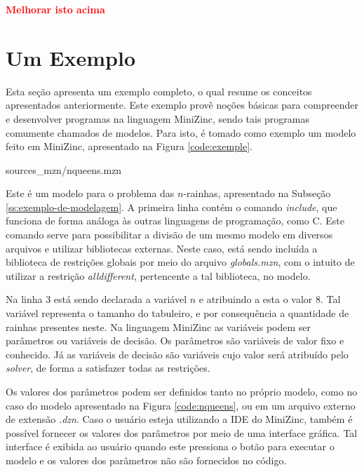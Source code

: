 {\bf \textcolor{red}{Melhorar isto acima}}



\section{Um Exemplo}

Esta seção apresenta um exemplo completo, o qual  resume os conceitos apresentados anteriormente.
Este exemplo provê noções básicas para compreender e desenvolver programas na linguagem MiniZinc, sendo tais programas comumente chamados de modelos. Para isto, é tomado como exemplo um modelo feito em MiniZinc, apresentado na Figura \ref{code:exemple}.


    {sources_mzn/nqueens.mzn}


Este é um modelo para o problema das $n$-rainhas, apresentado na Subseção \ref{ss:exemplo-de-modelagem}. A primeira linha contém o comando \textit{include}, que funciona de forma análoga às outras linguagens de programação, como C. Este comando serve para possibilitar a divisão de um mesmo modelo em diversos arquivos e utilizar bibliotecas externas. Neste caso, está sendo incluída a biblioteca de restrições globais por meio do arquivo \textit{globals.mzn}, com o intuito de utilizar a restrição \textit{alldifferent}, pertencente a tal biblioteca, no modelo.

Na linha 3 está sendo declarada a variável $n$ e atribuindo a esta o valor $8$. Tal variável representa o tamanho do tabuleiro, e por consequência a quantidade de rainhas presentes neste. Na linguagem MiniZinc as variáveis podem ser parâmetros ou variáveis de decisão. Os parâmetros são variáveis de valor fixo e conhecido. Já as variáveis de decisão são variáveis cujo valor será atribuído pelo \textit{solver}, de forma a satisfazer todas as restrições.

Os valores dos parâmetros podem ser definidos tanto no próprio modelo, como no caso do modelo apresentado na Figura \ref{code:nqueens}, ou em um arquivo externo de extensão \textit{.dzn}. Caso o usuário esteja utilizando a IDE do MiniZinc, também é possível fornecer os valores dos parâmetros por meio de uma interface gráfica. Tal interface é exibida ao usuário quando este pressiona o botão para executar o modelo e os valores dos parâmetros não são fornecidos no código.

